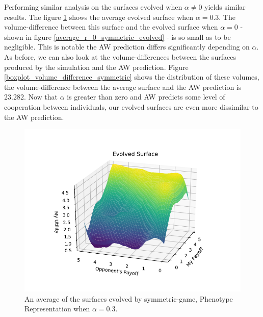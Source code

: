 \documentclass[11pt]{book}
\newcommand*{\np}{\par\noindent\newline}
\begin{document}
\np Performing similar analysis on the surfaces evolved when $\alpha \neq 0$ yields similar results.
The figure \ref{average_r_03_symmetric_evolved} shows the average evolved surface when $\alpha = 0.3$.
The volume-difference between this surface and the evolved surface when $\alpha = 0$ - shown in figure \ref{average_r_0_symmetric_evolved} - is so small as to be negligible.
This is notable the AW prediction differs significantly depending on $\alpha$.
As before, we can also look at the volume-differences between the surfaces produced by the simulation and the AW prediction.
Figure \ref{boxplot_volume_difference_symmetric} shows the distribution of these volumes, the volume-difference between the average surface and the AW prediction is 23.282.
Now that $\alpha$ is greater than zero and AW predicts some level of cooperation between individuals, our evolved surfaces are even more dissimilar to the AW prediction.

\begin{figure}
	\centering
	\includegraphics[scale=0.7]{resources/average_r_03_symmetric_evolved.png}
	\caption{An average of the surfaces evolved by symmetric-game, Phenotype Representation when $\alpha = 0.3$.}
	\label{average_r_03_symmetric_evolved}
\end{figure}
\end{document}

